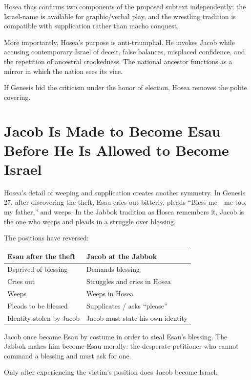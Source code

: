 Hosea thus confirms two components of the proposed subtext independently: the Israel-name is available for graphic/verbal play, and the wrestling tradition is compatible with supplication rather than macho conquest.

More importantly, Hosea's purpose is anti-triumphal. He invokes Jacob while accusing contemporary Israel of deceit, false balances, misplaced confidence, and the repetition of ancestral crookedness. The national ancestor functions as a mirror in which the nation sees its vice.

If Genesis hid the criticism under the honor of election, Hosea removes the polite covering.

\section{Jacob Is Made to Become Esau Before He Is Allowed to Become Israel}

Hosea's detail of weeping and supplication creates another symmetry. In Genesis 27, after discovering the theft, Esau cries out bitterly, pleads ``Bless me---me too, my father,'' and weeps. In the Jabbok tradition as Hosea remembers it, Jacob is the one who weeps and pleads in a struggle over blessing.

The positions have reversed:

\begin{center}
\begin{tabularx}{0.95\textwidth}{@{}p{}p{}@{}}
\toprule
\textbf{Esau after the theft} & \textbf{Jacob at the Jabbok}\\
\midrule
Deprived of blessing & Demands blessing\\
Cries out & Struggles and cries in Hosea\\
Weeps & Weeps in Hosea\\
Pleads to be blessed & Supplicates / asks ``please''\\
Identity stolen by Jacob & Jacob must state his own identity\\
\bottomrule
\end{tabularx}
\end{center}

Jacob once became Esau by costume in order to steal Esau's blessing. The Jabbok makes him become Esau morally: the desperate petitioner who cannot command a blessing and must ask for one.

Only after experiencing the victim's position does Jacob become Israel.

